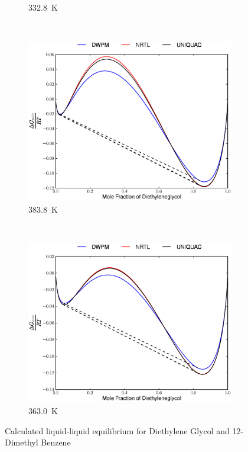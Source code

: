 \begin{figure}[hp]
\begin{subfigure}[h]{0.5\textwidth}
	\caption{332.8~$\mathrm{K}$} 
\end{subfigure}%
\\%
\begin{subfigure}[h]{0.5\textwidth}
	\centering
	\includegraphics[width = \textwidth]{Results_Parts/BinaryParams/diethyleneglycol-12-dimethylbenzene/AllModelsGibbsPlots/T_353.8.eps}
	\caption{383.8~$\mathrm{K}$} 
\end{subfigure}%
~%
\begin{subfigure}[h]{0.5\textwidth}
	\centering
	\includegraphics[width = \textwidth]{Results_Parts/BinaryParams/diethyleneglycol-12-dimethylbenzene/AllModelsGibbsPlots/T_363.0.eps}
	\caption{363.0~$\mathrm{K}$} 
\end{subfigure}%
\caption{Calculated liquid-liquid equilibrium for Diethylene Glycol and 12-Dimethyl Benzene}
\end{figure}
